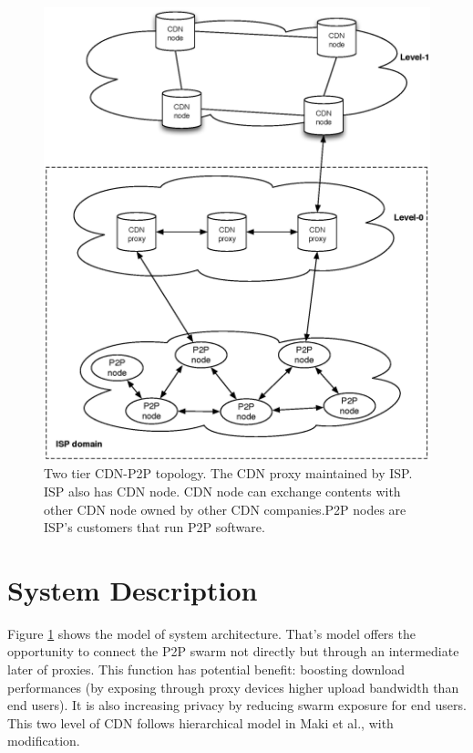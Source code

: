 \documentclass[paper]{ieice}
\begin{document}
\begin{figure}[hb]
\begin{center}
\includegraphics[scale=0.4]{graphs/two-tier-cdn-topology.eps}
\end{center}
\caption{Two tier CDN-P2P topology.
The CDN proxy maintained by ISP. ISP also has CDN node. CDN node can exchange contents with other CDN node owned by other CDN companies.P2P nodes are ISP's customers that run P2P software.}
\label{fig:twotier}
\vspace{-2mm}
\end{figure} 


 
\section{System Description}\label{description}

Figure \ref{fig:twotier} shows the model of system architecture.
That's model offers the opportunity to connect the P2P swarm not directly but through an intermediate later of proxies.
This function has potential benefit: boosting download performances (by exposing through proxy devices higher upload bandwidth than end users). 
It is also increasing privacy by reducing swarm exposure for end users.
This two level of CDN follows hierarchical model in Maki et al.,\cite{NaoyaMAKI2012} with modification.
\end{document}
